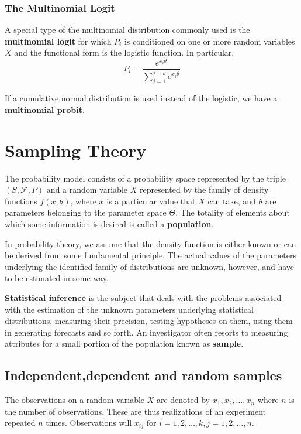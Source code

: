 \documentclass{article}
\begin{document}
\subsubsection{The Multinomial Logit}

A special type of the multinomial distribution commonly used is the \textbf{multinomial logit} for which \(P_i\) is conditioned on one or more random variables \(X\) and the functional form is the logistic function. In particular,
\begin{equation*}
    P_i=\frac{e^{x_i \theta}}{\sum_{j=1}^{j=k}e^{x_j \theta}}
\end{equation*}

If a cumulative normal distribution is used instead of the logistic, we have a \textbf{multinomial probit}.

\section{Sampling Theory}

The probability model consists of a probability space represented by the triple \((S,\mathcal{F},P)\) and a random variable \(X\) represented by the family of density functions \(f(x;\theta)\), where \(x\) is a particular value that \(X\) can take, and \(\theta\) are parameters belonging to the parameter space \(\Theta\). The totality of elements about which some information is desired is called a \textbf{population}.

In probability theory, we assume that the density function is either known or can be derived from some fundamental principle. The actual values of the parameters underlying the identified family of distributions are unknown, however, and have to be estimated in some way.

\textbf{Statistical inference} is the subject that deals with the problems associated with the estimation of the unknown parameters underlying statistical distributions, measuring their precision, testing hypotheses on them, using them in generating forecasts and so forth. An investigator often resorts to measuring attributes for a small portion of the population known as \textbf{sample}.

\subsection{Independent,dependent and random samples}

The observations on a random variable \(X\) are denoted by  \(x_1,x_2,\dots,x_n\) where \(n\) is the number of observations. These are thus realizations of an experiment repeated \(n\) times. Observations will \(x_{ij} \text{ for } i=1,2,\dots,k, j=1,2,\dots,n\).
\end{document}
